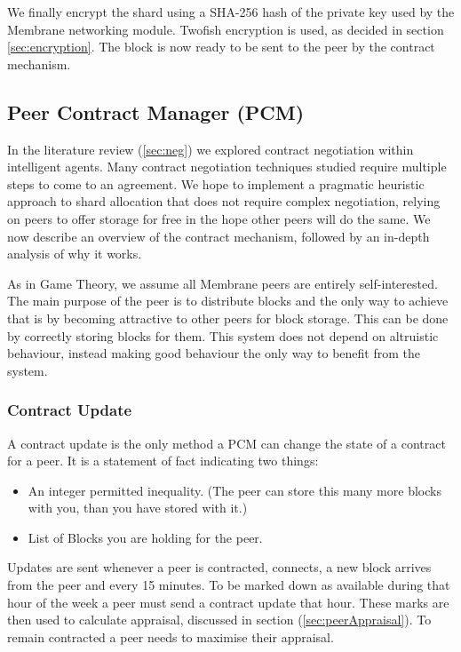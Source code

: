 \documentclass[11pt, a4paper, twoside]{report}
\begin{document}
We finally encrypt the shard using a SHA-256 hash of the private key used by the Membrane networking module. Twofish encryption is used, as decided in section \ref{sec:encryption}. The block is now ready to be sent to the peer by the contract mechanism.

\subsection{Peer Contract Manager (PCM)} \label{sec:contractMech}

In the literature review (\ref{sec:neg}) we explored contract negotiation within intelligent agents. Many contract negotiation techniques studied require multiple steps to come to an agreement. We hope to implement a pragmatic heuristic approach to shard allocation that does not require complex negotiation, relying on peers to offer storage for free in the hope other peers will do the same. We now describe an overview of the contract mechanism, followed by an in-depth analysis of why it works.

As in Game Theory, we assume all Membrane peers are entirely self-interested. The main purpose of the peer is to distribute blocks and the only way to achieve that is by becoming attractive to other peers for block storage. This can be done by correctly storing blocks for them. This system does not depend on altruistic behaviour, instead making good behaviour the only way to benefit from the system.

\subsubsection{Contract Update}

A contract update is the only method a PCM can change the state of a contract for a peer. It is a statement of fact indicating two things:

\begin{itemize}
 \item An integer permitted inequality. (The peer can store this many more blocks with you, than you have stored with it.)
 \item List of Blocks you are holding for the peer.
\end{itemize}

Updates are sent whenever a peer is contracted, connects, a new block arrives from the peer and every 15 minutes. To be marked down as available during that hour of the week a peer must send a contract update that hour. These marks are then used to calculate appraisal, discussed in section (\ref{sec:peerAppraisal}). To remain contracted a peer needs to maximise their appraisal.
\end{document}
